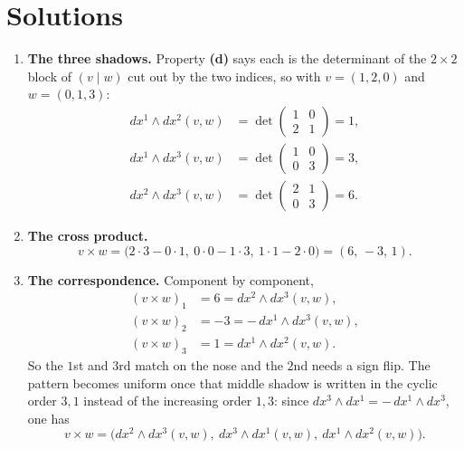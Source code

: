 
\section{Solutions}
\label{sec:differential_forms_solutions}

\begin{exercisesolution}
\label{sol:ai_three_shadows}
\begin{enumerate}[label=\textbf{(\alph*)}]
  \item \textbf{The three shadows.} Property \textbf{(d)} says each is the determinant of the
    $2\times2$ block of $(v \mid w)$ cut out by the two indices, so with $v = (1,2,0)$ and
    $w = (0,1,3)$:
    \begin{align*}
      dx^1\wedge dx^2(v,w) &= \det\begin{pmatrix}1 & 0\\ 2 & 1\end{pmatrix} = 1, \\
      dx^1\wedge dx^3(v,w) &= \det\begin{pmatrix}1 & 0\\ 0 & 3\end{pmatrix} = 3, \\
      dx^2\wedge dx^3(v,w) &= \det\begin{pmatrix}2 & 1\\ 0 & 3\end{pmatrix} = 6.
    \end{align*}
  \item \textbf{The cross product.}
    \[v \times w = \big(2\cdot3 - 0\cdot1,\ 0\cdot0 - 1\cdot3,\ 1\cdot1 - 2\cdot0\big)
      = (6,\,-3,\,1).\]
  \item \textbf{The correspondence.} Component by component,
    \begin{align*}
      (v\times w)_1 &= 6 = dx^2\wedge dx^3(v,w), \\
      (v\times w)_2 &= -3 = -\,dx^1\wedge dx^3(v,w), \\
      (v\times w)_3 &= 1 = dx^1\wedge dx^2(v,w).
    \end{align*}
    So the $1$st and $3$rd match on the nose and the $2$nd needs a sign flip. The pattern becomes
    uniform once that middle shadow is written in the cyclic order $3,1$ instead of the increasing
    order $1,3$: since $dx^3\wedge dx^1 = -\,dx^1\wedge dx^3$, one has
    \[v\times w = \big(dx^2\wedge dx^3(v,w),\ dx^3\wedge dx^1(v,w),\ dx^1\wedge dx^2(v,w)\big).\]
\end{enumerate}


\end{exercisesolution}
